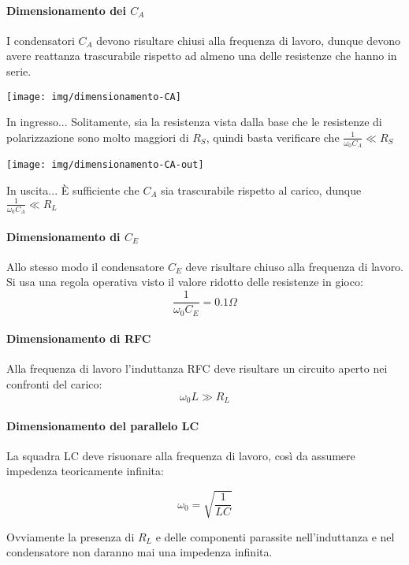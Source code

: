 \paragraph{Dimensionamento dei $C_A$}
I condensatori $C_A$ devono risultare chiusi alla frequenza di lavoro, dunque devono avere reattanza trascurabile rispetto ad almeno una delle resistenze che hanno in serie.

\begin{multicols}{2}
	\begin{center}
		\texttt{[image: img/dimensionamento-CA]}
	\end{center}
              \columnbreak
	In ingresso... Solitamente, sia la resistenza vista dalla base che le resistenze di polarizzazione sono molto maggiori di $R_S$, quindi basta verificare che $\frac{1}{\omega_0 C_A} \ll R_S$
      \end{multicols}	
\begin{multicols}{2}
\begin{center}
	\texttt{[image: img/dimensionamento-CA-out]}
\end{center}
      \columnbreak
		In uscita... È sufficiente che $C_A$ sia trascurabile rispetto al carico, dunque $\frac{1}{\omega_0 C_A} \ll R_L$
\end{multicols}

\paragraph{Dimensionamento di $C_E$}
Allo stesso modo il condensatore $C_E$ deve risultare chiuso alla frequenza di lavoro. Si usa una regola operativa visto il valore ridotto delle resistenze in gioco:
\[\frac{1}{\omega_0 C_E} = 0.1 \Omega\]


\begin{multicols}{2}
	\paragraph{Dimensionamento di RFC}
	Alla frequenza di lavoro l'induttanza RFC deve risultare un circuito aperto nei confronti del carico:
	$$\omega_0 L \gg R_L$$
	\vfill\null
	\columnbreak
	\paragraph{Dimensionamento del parallelo LC}
	La squadra LC deve risuonare alla frequenza di lavoro, così da assumere impedenza teoricamente infinita:
	
	$$\omega_0 = \sqrt{\frac{1}{LC}}$$
	
	Ovviamente la presenza di $R_L$ e delle componenti parassite nell'induttanza e nel condensatore non daranno mai una impedenza infinita.
	
\end{multicols}

